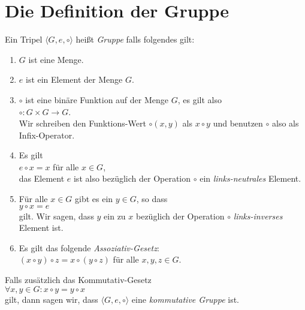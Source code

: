 \section{Die Definition der Gruppe}
\begin{Definition}[Gruppe]
Ein Tripel $\langle G, e, \circ \rangle$ heißt \emph{Gruppe} falls folgendes gilt:
\begin{enumerate}
\item $G$ ist eine Menge.
\item $e$ ist ein Element der Menge $G$.
\item $\circ$ ist eine binäre Funktion auf der Menge $G$, es gilt also
      \\[0.2cm]
      \hspace*{1.3cm}
      $\circ : G \times G \rightarrow G$.
      \\[0.2cm]
      Wir schreiben den Funktions-Wert $\circ(x,y)$ als $x \circ y$ und benutzen
      $\circ$ also als Infix-Operator.
\item Es gilt
      \\
      \hspace*{1.3cm}
      $e \circ x = x$ \quad für alle $x \in G$,
      \\[0.2cm]
      das Element $e$ ist also bezüglich der Operation $\circ$ ein \emph{links-neutrales}
      Element.
\item Für alle $x \in G$ gibt es ein $y \in G$, so dass
      \\[0.2cm]
      \hspace*{1.3cm}
      $y \circ x = e$
      \\[0.2cm]
      gilt.  Wir sagen, dass $y$ ein zu $x$ bezüglich der Operation $\circ$
      \emph{links-inverses} Element ist.
\item Es gilt das folgende \emph{Assoziativ-Gesetz}:
      \\[0.2cm]
      \hspace*{1.3cm}
      $(x \circ y) \circ z = x \circ (y \circ z)$ \quad für alle $x,y,z \in G$.
\end{enumerate}
Falls zusätzlich das Kommutativ-Gesetz
\\[0.2cm]
\hspace*{1.3cm}
$\forall x, y \in G: x \circ y = y \circ x$
\\[0.2cm]
gilt, dann sagen wir, dass $\langle G, e, \circ \rangle$ eine \emph{kommutative Gruppe} ist.
\end{Definition}

